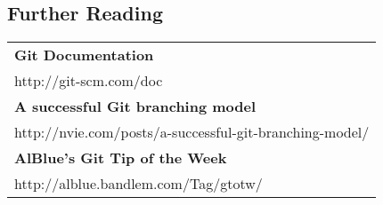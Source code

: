 \begin{multicols*}{3}
\section{Further Reading}

\begin{tabularx}{0.33\textwidth}{X}
\textbf{Git Documentation}\\
http://git-scm.com/doc
\\
\textbf{A successful Git branching model}\\
http://nvie.com/posts/a-successful-git-branching-model/
\\
\textbf{AlBlue's Git Tip of the Week}\\
http://alblue.bandlem.com/Tag/gtotw/
\end{tabularx}

\end{multicols*}


